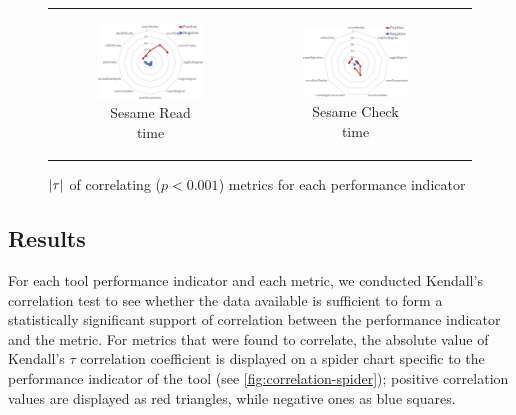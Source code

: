 \begin{figure}[tp]
\begin{center}
\begin{tabular}{c c c}
\begin{subfigure}[t]{0.31\textwidth}
	    \includegraphics[width=0.95\textwidth]{figures/spider-sesame-read.pdf}
	    \caption{Sesame Read time}\end{subfigure} &
	    \begin{subfigure}[t]{0.31\textwidth}\centering
	    \includegraphics[width=0.95\textwidth]{figures/spider-sesame-check.pdf}
	    \caption{Sesame Check time}\end{subfigure} 
    \end{tabular}

  \caption{$|{\tau}|$ of correlating ($p<0.001$) metrics for each performance indicator}
  \label{fig:correlation-spider}
\end{center}
\end{figure}

\subsection{Results}
For each tool performance indicator and each metric, we conducted Kendall's correlation test to see whether the data available is sufficient to form a statistically significant support of correlation between the performance indicator and the metric. For metrics that were found to correlate, the absolute value of Kendall's $\tau$ correlation coefficient is displayed on a spider chart specific to the performance indicator of the tool (see \autoref{fig:correlation-spider}); positive correlation values are displayed as red triangles, while negative ones as blue squares.  

